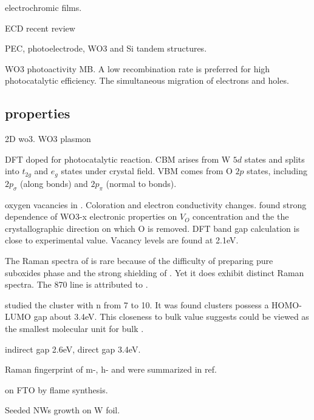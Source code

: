 electrochromic films. \cite{Yoshimura1985}

ECD \cite{Jiao2012} recent review \cite{Mortimer2011}

PEC, photoelectrode, WO3 and Si tandem structures.\cite{Coridan2013}

WO3 photoactivity MB. \cite{Watcharenwong2008}
A low recombination rate is preferred for high photocatalytic efficiency. The simultaneous migration of electrons and holes.



\subsection{properties}


2D wo3.\cite{Kalantar-zadeh2010a} 
WO3 plasmon \cite{Manthiram2012}

DFT doped  for photocatalytic reaction.\cite{Wang2012} CBM arises from W $5d$ states and splits into $t_{2g}$ and $e_g$ states under crystal field. VBM comes from O $2p$ states, including $2p_\sigma$ (along  bonds) and $2p_\pi$ (normal to  bonds).


oxygen vacancies in .\cite{Wang2011b}  Coloration and electron conductivity changes. \citeauthor{Wang2011b} found strong dependence of WO3-x electronic properties on $V_O$ concentration and the the crystallographic direction on which O is removed. DFT band gap calculation is close to experimental value. Vacancy levels are found at 2.1eV.

The Raman spectra of  is rare because of the difficulty of preparing pure suboxides phase and the strong shielding of . Yet it does exhibit distinct Raman spectra. \cite{Tenne2005} The 870 line is attributed to .\cite{Hardcastle1995}


\citeauthor{Huang2006} studied the  cluster with n from 7 to 10.\cite{Huang2006} It was found  clusters possess a HOMO-LUMO gap about 3.4eV. This closeness to bulk value suggests  could be viewed as the smallest molecular unit for bulk .


 indirect gap 2.6eV, direct gap 3.4eV. \cite{Koffyberg1979}

Raman fingerprint of m-, h- and  were summarized in ref\cite{Daniel1987}.

 on FTO by flame synthesis.\cite{Rao2014} \cite{Xu2006}

Seeded  NWs growth on W foil.\cite{Hong2006a}

